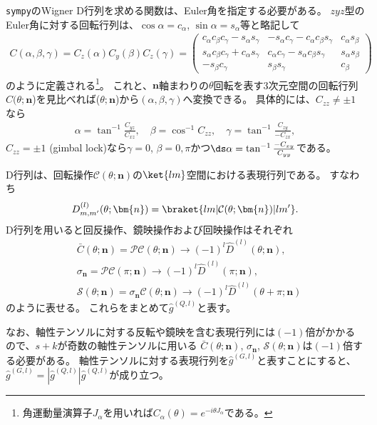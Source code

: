 \documentclass[11pt]{easymemo}
\begin{document}
\texttt{sympy}のWigner D行列を求める関数は、Euler角を指定する必要がある。
$zyz$型のEuler角に対する回転行列は、$\cos\alpha=c_{\alpha}$, $\sin\alpha=s_{\alpha}$等と略記して
\begin{align}
C(\alpha,\beta,\gamma)=C_{z}(\alpha)C_{y}(\beta)C_{z}(\gamma)
=\begin{pmatrix}
c_{\alpha}c_{\beta}c_{\gamma}-s_{\alpha}s_{\gamma} & -s_{\alpha}c_{\gamma}-c_{\alpha}c_{\beta}s_{\gamma} & c_{\alpha}s_{\beta} \\
s_{\alpha}c_{\beta}c_{\gamma}+c_{\alpha}s_{\gamma} & c_{\alpha}c_{\gamma}-s_{\alpha}c_{\beta}s_{\gamma} & s_{\alpha}s_{\beta} \\
-s_{\beta}c_{\gamma} & s_{\beta}s_{\gamma} & c_{\beta}
\end{pmatrix}
\end{align}
のように定義される\footnote{角運動量演算子$J_{\alpha}$を用いれば$C_{\alpha}(\theta)=e^{-i\theta J_{\alpha}}$である。}。
これと、$\bm{n}$軸まわりの$\theta$回転を表す3次元空間の回転行列$C(\theta;\bm{n}$)を見比べれば($\theta;\bm{n}$)から$(\alpha,\beta,\gamma)$へ変換できる。
具体的には、$C_{zz}\ne \pm1$なら
\begin{align}
\alpha=\tan^{-1}\frac{C_{yz}}{C_{xz}},
\quad
\beta=\cos^{-1}C_{zz},
\quad
\gamma=\tan^{-1}\frac{C_{zy}}{-C_{zx}},
\end{align}
$C_{zz}=\pm1$ (gimbal lock)なら$\gamma=0$, $\beta=0,\pi$かつ$\ds \alpha=\tan^{-1}\frac{-C_{xy}}{C_{yy}}$である。

D行列は、回転操作$\mathcal{C}(\theta;\bm{n})$の$\ket{lm}$空間における表現行列である。
すなわち
\begin{align}
D_{m,m'}^{(l)}(\theta;\bm{n})=\braket{lm|\mathcal{C}(\theta;\bm{n})|lm'}.
\end{align}
D行列を用いると回反操作、鏡映操作および回映操作はそれぞれ
\begin{align}
&
\bar{C}(\theta;\bm{n})=\mathcal{P}\mathcal{C}(\theta;\bm{n})\to(-1)^{l}\hat{D}^{(l)}(\theta;\bm{n}),
\\&
\sigma_{\bm{n}}=\mathcal{P}\mathcal{C}(\pi;\bm{n})\to(-1)^{l}\hat{D}^{(l)}(\pi;\bm{n}),
\\&
\mathcal{S}(\theta;\bm{n})=\sigma_{\bm{n}}\mathcal{C}(\theta;\bm{n})\to(-1)^{l}\hat{D}^{(l)}(\theta+\pi;\bm{n})
\end{align}
のように表せる。
これらをまとめて$\hat{g}^{(Q,l)}$と表す。

なお、軸性テンソルに対する反転や鏡映を含む表現行列には$(-1)$倍がかかるので、$s+k$が奇数の軸性テンソルに用いる
$\bar{C}(\theta;\bm{n})$, $\sigma_{\bm{n}}$, $\mathcal{S}(\theta;\bm{n})$は$(-1)$倍する必要がある。
軸性テンソルに対する表現行列を$\hat{g}^{(G,l)}$と表すことにすると、$\hat{g}^{(G,l)}=|\hat{g}^{(Q,l)}|\hat{g}^{(Q,l)}$が成り立つ。
\end{document}
